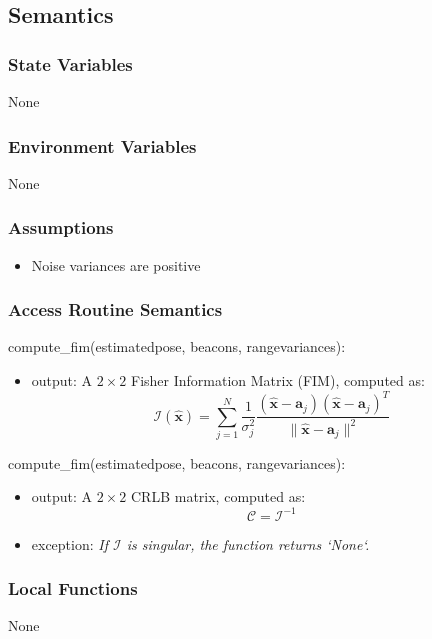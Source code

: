 \documentclass[12pt, titlepage]{article}
\begin{document}
\subsection{Semantics}

\subsubsection{State Variables}
None

\subsubsection{Environment Variables}
None

\subsubsection{Assumptions}
\begin{itemize}
  \item Noise variances are positive
\end{itemize}

\subsubsection{Access Routine Semantics}

\noindent compute\_fim(estimated\textunderscore pose, beacons, range\textunderscore variances):
\begin{itemize}
\item output: A \( 2 \times 2 \) Fisher Information Matrix (FIM), computed as:
\[
\mathcal{I}(\hat{\mathbf{x}}) = \sum_{j=1}^{N} \frac{1}{\sigma_j^2} \frac{(\hat{\mathbf{x}} - \mathbf{a}_j)(\hat{\mathbf{x}} - \mathbf{a}_j)^T}{\|\hat{\mathbf{x}} - \mathbf{a}_j\|^2}
\]
\end{itemize}

\noindent compute\_fim(estimated\textunderscore pose, beacons, range\textunderscore variances):
\begin{itemize}
\item output: A \( 2 \times 2 \) CRLB matrix, computed as:
\[
\mathcal{C} = \mathcal{I}^{-1}
\]
\item exception: \textit{If \( \mathcal{I} \) is singular, the function returns `None`.}
\end{itemize}

\subsubsection{Local Functions}
None
\end{document}
